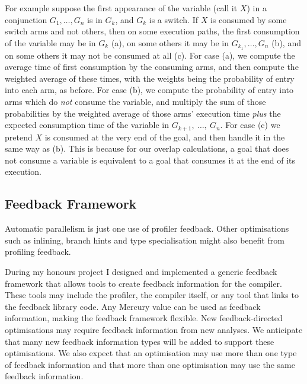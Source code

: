For example
suppose the first appearance of the variable (call it $X$)
in a conjunction $G_1, \ldots, G_n$ is in $G_k$, and $G_k$ is a switch.
If $X$ is consumed by some switch arms and not others,
then on some execution paths,
the first consumption of the variable may be in $G_k$ (a),
on some others it may be in $G_{k_1}, \ldots, G_n$ (b),
and on some others it may not be consumed at all (c).
For case (a),
we compute the average time of first consumption by the consuming arms,
and then compute the weighted average of these times,
with the weights being the probability of entry into each arm, as before.
For case (b), we compute the probability of entry
into arms which do \emph{not} consume the variable,
and multiply the sum of those probabilities
by the weighted average of those arms' execution time
\emph{plus} the expected consumption time of the variable
in $G_{k+1},~\ldots,~G_n$.
For case (c)
we pretend $X$ is consumed at the very end of the goal,
and then handle it in the same way as (b).
This is because for our overlap calculations,
a goal that does not consume a variable is equivalent to
a goal that consumes it at the end of its execution.

\subsection{Feedback Framework}
\label{sec:feedback}

Automatic parallelism is just one use of profiler feedback.
Other optimisations
such as inlining,
branch hints
and type specialisation
might also benefit from profiling feedback.

During my honours project I designed and implemented a generic feedback
framework that allows tools to create feedback information for the compiler.
These tools may include the profiler, the compiler itself,
or any tool that links to the feedback library code.
Any Mercury value can be used as feedback information,
making the feedback framework flexible.
New feedback-directed optimisations may require feedback information
from new analyses.
We anticipate that many new feedback information types will be added to
support these optimisations.
We also expect that an optimisation may use more than one type of
feedback information and that more than one optimisation may use the
same feedback information.

